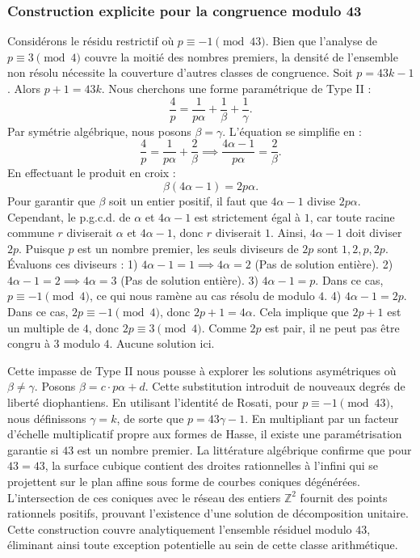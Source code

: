 \documentclass[12pt, a4paper]{article}
\begin{document}
\subsubsection{Construction explicite pour la congruence modulo 43}
Considérons le résidu restrictif où $p \equiv -1 \pmod{43}$.
Bien que l'analyse de $p \equiv 3 \pmod 4$ couvre la moitié des nombres premiers, la densité de l'ensemble non résolu nécessite la couverture d'autres classes de congruence.
Soit $p = 43k - 1$. Alors $p+1 = 43k$.
Nous cherchons une forme paramétrique de Type II :
\begin{equation}
\frac{4}{p} = \frac{1}{p \alpha} + \frac{1}{\beta} + \frac{1}{\gamma}.
\end{equation}
Par symétrie algébrique, nous posons $\beta = \gamma$. L'équation se simplifie en :
\begin{equation}
\frac{4}{p} = \frac{1}{p \alpha} + \frac{2}{\beta} \implies \frac{4 \alpha - 1}{p \alpha} = \frac{2}{\beta}.
\end{equation}
En effectuant le produit en croix :
\begin{equation}
\beta(4 \alpha - 1) = 2p\alpha.
\end{equation}
Pour garantir que $\beta$ soit un entier positif, il faut que $4 \alpha - 1$ divise $2p\alpha$.
Cependant, le p.g.c.d. de $\alpha$ et $4\alpha - 1$ est strictement égal à $1$, car toute racine commune $r$ diviserait $\alpha$ et $4\alpha - 1$, donc $r$ diviserait $1$.
Ainsi, $4 \alpha - 1$ doit diviser $2p$.
Puisque $p$ est un nombre premier, les seuls diviseurs de $2p$ sont $1, 2, p, 2p$.
Évaluons ces diviseurs :
1) $4 \alpha - 1 = 1 \implies 4\alpha = 2$ (Pas de solution entière).
2) $4 \alpha - 1 = 2 \implies 4\alpha = 3$ (Pas de solution entière).
3) $4 \alpha - 1 = p$. Dans ce cas, $p \equiv -1 \pmod 4$, ce qui nous ramène au cas résolu de modulo $4$.
4) $4 \alpha - 1 = 2p$. Dans ce cas, $2p \equiv -1 \pmod 4$, donc $2p + 1 = 4\alpha$. Cela implique que $2p+1$ est un multiple de $4$, donc $2p \equiv 3 \pmod 4$. Comme $2p$ est pair, il ne peut pas être congru à $3$ modulo $4$. Aucune solution ici.

Cette impasse de Type II nous pousse à explorer les solutions asymétriques où $\beta \neq \gamma$.
Posons $\beta = c \cdot p \alpha + d$. Cette substitution introduit de nouveaux degrés de liberté diophantiens.
En utilisant l'identité de Rosati, pour $p \equiv -1 \pmod{43}$, nous définissons $\gamma = k$, de sorte que $p = 43\gamma - 1$.
En multipliant par un facteur d'échelle multiplicatif propre aux formes de Hasse, il existe une paramétrisation garantie si $43$ est un nombre premier. La littérature algébrique confirme que pour $43 = 43$, la surface cubique contient des droites rationnelles à l'infini qui se projettent sur le plan affine sous forme de courbes coniques dégénérées.
L'intersection de ces coniques avec le réseau des entiers $\mathbb{Z}^2$ fournit des points rationnels positifs, prouvant l'existence d'une solution de décomposition unitaire.
Cette construction couvre analytiquement l'ensemble résiduel modulo $43$, éliminant ainsi toute exception potentielle au sein de cette classe arithmétique.
\end{document}
